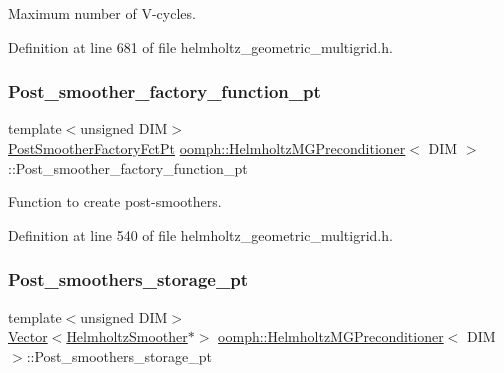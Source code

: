 Maximum number of V-\/cycles. 



Definition at line 681 of file helmholtz\+\_\+geometric\+\_\+multigrid.\+h.

\mbox{\label{classoomph_1_1HelmholtzMGPreconditioner_a6c837962598479ba2eafd3978fccab9c}} 
\subsubsection{\texorpdfstring{Post\+\_\+smoother\+\_\+factory\+\_\+function\+\_\+pt}{Post\_smoother\_factory\_function\_pt}}
{\footnotesize\ttfamily template$<$unsigned D\+IM$>$ \\
\hyperlink{classoomph_1_1HelmholtzMGPreconditioner_a3405bc1f75c5e1e83601cd9b0e02634b}{Post\+Smoother\+Factory\+Fct\+Pt} \hyperlink{classoomph_1_1HelmholtzMGPreconditioner}{oomph\+::\+Helmholtz\+M\+G\+Preconditioner}$<$ D\+IM $>$\+::Post\+\_\+smoother\+\_\+factory\+\_\+function\+\_\+pt\hspace{0.3cm}{\ttfamily [private]}}



Function to create post-\/smoothers. 



Definition at line 540 of file helmholtz\+\_\+geometric\+\_\+multigrid.\+h.

\mbox{\label{classoomph_1_1HelmholtzMGPreconditioner_abb0d32382cd2a06081359b3fda7cc15d}} 
\subsubsection{\texorpdfstring{Post\+\_\+smoothers\+\_\+storage\+\_\+pt}{Post\_smoothers\_storage\_pt}}
{\footnotesize\ttfamily template$<$unsigned D\+IM$>$ \\
\hyperlink{classoomph_1_1Vector}{Vector}$<$\hyperlink{classoomph_1_1HelmholtzSmoother}{Helmholtz\+Smoother}$\ast$$>$ \hyperlink{classoomph_1_1HelmholtzMGPreconditioner}{oomph\+::\+Helmholtz\+M\+G\+Preconditioner}$<$ D\+IM $>$\+::Post\+\_\+smoothers\+\_\+storage\+\_\+pt\hspace{0.3cm}{\ttfamily [private]}}



